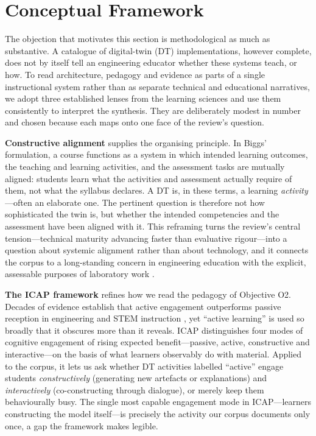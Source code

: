 \section{Conceptual Framework}\label{conceptual-framework}

The objection that motivates this section is methodological as much as
substantive. A catalogue of digital-twin (DT) implementations, however complete,
does not by itself tell an engineering educator whether these systems teach, or
how. To read architecture, pedagogy and evidence as parts of a single
instructional system rather than as separate technical and educational
narratives, we adopt three established lenses from the learning sciences and use
them consistently to interpret the synthesis. They are deliberately modest in
number and chosen because each maps onto one face of the review's question.

\textbf{Constructive alignment} \cite{biggs_enhancing_1996,biggs_teaching_2011} supplies
the organising principle. In Biggs' formulation, a course functions as a system
in which intended learning outcomes, the teaching and learning activities, and
the assessment tasks are mutually aligned: students learn what the activities and
assessment actually require of them, not what the syllabus declares. A DT is, in
these terms, a learning \emph{activity}---often an elaborate one. The pertinent question
is therefore not how sophisticated the twin is, but whether the intended
competencies and the assessment have been aligned with it. This reframing turns
the review's central tension---technical maturity advancing faster than evaluative
rigour---into a question about systemic alignment rather than about technology, and
it connects the corpus to a long-standing concern in engineering education with
the explicit, assessable purposes of laboratory work \cite{feisel_role_2005}.

\textbf{The ICAP framework} \cite{chi_icap_2014} refines how we read the pedagogy of
Objective O2. Decades of evidence establish that active engagement outperforms
passive reception in engineering and STEM instruction \cite{prince_does_2004,freeman_active_2014}, yet ``active learning'' is used so broadly that it obscures
more than it reveals. ICAP distinguishes four modes of cognitive engagement of
rising expected benefit---passive, active, constructive and interactive---on the
basis of what learners observably do with material. Applied to the corpus, it
lets us ask whether DT activities labelled ``active'' engage students
\emph{constructively} (generating new artefacts or explanations) and \emph{interactively}
(co-constructing through dialogue), or merely keep them behaviourally busy. The
single most capable engagement mode in ICAP---learners constructing the model
itself---is precisely the activity our corpus documents only once, a gap the
framework makes legible.

